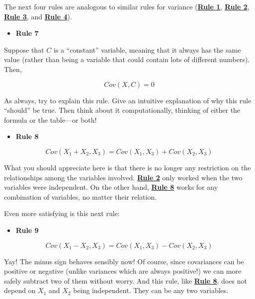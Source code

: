 \documentclass[
]{book}
\providecommand{\tightlist}{%
  \setlength{\itemsep}{0pt}\setlength{\parskip}{0pt}}
\begin{document}
The next four rules are analogous to similar rules for variance (\href{./variance.html\#Rule1}{\textbf{Rule 1}}, \href{./variance.html\#Rule2}{\textbf{Rule 2}}, \href{./variance.html\#Rule3}{\textbf{Rule 3}}, and \href{./variance.html\#Rule4}{\textbf{Rule 4}}).

\begin{itemize}
\tightlist
\item
  \textbf{Rule 7}
\end{itemize}

Suppose that \(C\) is a ``constant'' variable, meaning that it always has the same value (rather than being a variable that could contain lots of different numbers). Then,

\[
Cov\left(X, C\right) = 0
\]

As always, try to explain this rule. Give an intuitive explanation of why this rule ``should'' be true. Then think about it computationally, thinking of either the formula or the table---or both!

\begin{itemize}
\tightlist
\item
  \textbf{Rule 8}
\end{itemize}

\[
Cov\left(X_{1} + X_{2}, X_{3}\right) = Cov\left(X_{1}, X_{3}\right) + Cov\left(X_{2}, X_{3}\right)  
\]

What you should appreciate here is that there is no longer any restriction on the relationships among the variables involved. \href{./variance.html\#Rule2}{\textbf{Rule 2}} only worked when the two variables were independent. On the other hand, \protect\hyperlink{Rule8}{\textbf{Rule 8}} works for any combination of variables, no matter their relation.

Even more satisfying is this next rule:

\begin{itemize}
\tightlist
\item
  \textbf{Rule 9}
\end{itemize}

\[
Cov\left(X_{1} - X_{2}, X_{3}\right) = Cov\left(X_{1}, X_{3}\right) - Cov\left(X_{2}, X_{3}\right)  
\]

Yay! The minus sign behaves sensibly now! Of course, since covariances can be positive or negative (unlike variances which are always positive!) we can more safely subtract two of them without worry. And this rule, like \protect\hyperlink{Rule8}{\textbf{Rule 8}}, does not depend on \(X_{1}\) and \(X_{2}\) being independent. They can be any two variables.
\end{document}
